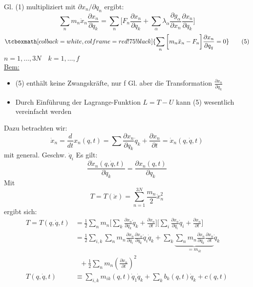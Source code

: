 \documentclass[titlepage,12pt,a4paper,ngerman]{report}
\newcommand{\ub}[1]{\underbrace{#1}}
\newcommand{\rmbox}[1]{\tcboxmath[colback=white,colframe=red!75!black]{#1}} %
\renewcommand{\boxed}{\rmbox}
\begin{document}
{Gl. (1) multipliziert mit $ \partial x_n / \partial q_n $ ergibt:
$$\sum_{n} m_n \ddot{x}_n \frac{\partial x_n}{\partial q_k} = \sum_n \bigg[ F_n \frac{\partial x_n}{\partial q_k} + \sum_\alpha \lambda_\alpha \frac{\partial g_\alpha}{\partial x_n } \frac{\partial x_n}{\partial q_k} \bigg]$$
\begin{equation*}
\boxed{\sum_n \bigg[ m _n \ddot{x}_n - F_n \bigg] \frac{\partial x_n}{\partial q_q} = 0 } \tag{5}
\end{equation*}
$ n = 1,  \dots , 3N \quad k = 1, \dots , f$\\
\underline{Bem:}
\begin{itemize}
	\item (5) enthält keine Zwangskräfte, nur f Gl. aber die Transformation $ \frac{\partial x_n}{\partial q_k} $
	\item Durch Einführung der Lagrange-Funktion $ L = T-U $ kann (5) wesentlich vereinfacht werden
\end{itemize} 
Dazu betrachten wir:\\
\begin{equation*}
\dot{x}_n = \frac{d}{dt} x_n (q,t) = \sum \frac{\partial x_n}{\partial q_k} \dot{q}_k + \frac{\partial x_n}{\partial t} = \dot{x}_n (q,\dot{q},t) \tag{6}
\end{equation*}
mit general. Geschw. $ \dot{q}_i $ Es gilt:
\begin{equation*}
\frac{\partial \dot{x}_n (q,\dot{q},t)}{\partial \dot{q}_k} = \frac{\partial x_n (q,t)}{\partial q_k} \tag{7}
\end{equation*}
Mit 
\begin{equation*}
T = T(\dot{x}) = \sum_{n=1}^{3N} \frac{m_n}{2} \dot{x}_n^2 \tag{8}
\end{equation*}
ergibt sich: 
\begin{align*}
T = T(q,\dot{q},t) &= \frac{1}{2} \sum_n m_n \bigg[ \sum_k \frac{\partial x_n}{\partial q_k} \dot{q}_k + \frac{\partial
	x_n}{\partial t} \bigg] \bigg[ \sum_i \frac{\partial x_n}{\partial q_i} \dot{q}_i + \frac{\partial x_n}{\partial t}\bigg]\\
&= \frac{1}{2} \sum_{i,k} \sum_n m_n \frac{\partial x_n }{\partial q_i} \frac{\partial x_n}{\partial q_k} \dot{q}_i \dot{q}_k + \sum_k \ub{\sum_n m_n \frac{\partial x_n}{\partial q_k} \frac{\partial x_n}{\partial t}}_{= m_{ik}} \dot{q}_k \\
& \ \ \ + \frac{1}{2} \sum_n m_n \left(\frac{\partial x_n}{\partial t}\right)^2\\
T(q,\dot{q},t) & \equiv \sum_{i,k} m_{ik} (q,t) \dot{q}_1 \dot{q}_k + \sum_k  b_k (q,t) \dot{q}_k + c(q,t) \tag{9}

\end{align*}}
\end{document}
